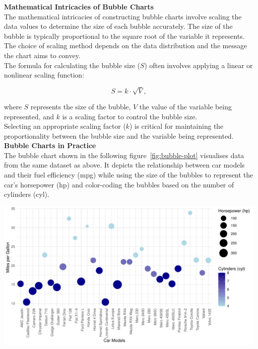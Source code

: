 \documentclass{article}\usepackage[]{graphicx}\usepackage[]{xcolor}
\makeatletter
\def\maxwidth{ %
  \ifdim\Gin@nat@width>\linewidth
    \linewidth
  \else
    \Gin@nat@width
  \fi
}
\newenvironment{knitrout}{}{} %
\makeatother
\begin{document}
\noindent
\textbf{Mathematical Intricacies of Bubble Charts}\\
The mathematical intricacies of constructing bubble charts involve scaling the data values to determine the size of each bubble accurately. The size of the bubble is typically proportional to the square root of the variable it represents. The choice of scaling method depends on the data distribution and the message the chart aims to convey.\\

\noindent
The formula for calculating the bubble size (\(S\)) often involves applying a linear or nonlinear scaling function:

\[
S = k \cdot \sqrt{V},
\]

\noident where \(S\) represents the size of the bubble, \(V\) the value of the variable being represented, and \(k\) is a scaling factor to control the bubble size.\\

\noindent
Selecting an appropriate scaling factor (\(k\)) is critical for maintaining the proportionality between the bubble size and the variable being represented.\\

\noindent
\textbf{Bubble Charts in Practice}\\
The bubble chart shown in the following figure~\ref{fig:bubble-plot} visualises data from the same dataset as above. It depicts the relationship between car models and their fuel efficiency (mpg) while using the size of the bubbles to represent the car's horsepower (hp) and color-coding the bubbles based on the number of cylinders (cyl).\\

\begin{knitrout}\scriptsize
{}\color{fgcolor}

{\centering \includegraphics[width=\maxwidth]{figure/beamer-bubble-plot-1} 

}


\end{knitrout}
\end{document}
